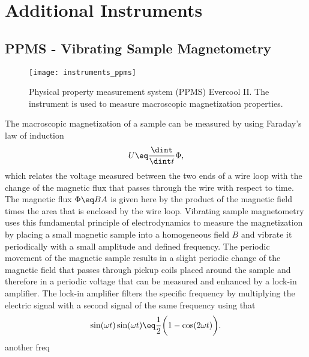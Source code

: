 \documentclass[\main/dresen_thesis.tex]{subfiles}
\begin{document}
\chapter{Additional Instruments}
\section{PPMS - Vibrating Sample Magnetometry}
\label{app:additionalExperimentalTechniques:vsm}
\begin{figure}[h]
  \centering
  \texttt{[image: instruments\_ppms]}
  \caption{\label{fig:appendix:instruments:ppms}Physical property measurement system (PPMS) Evercool II. The instrument is used to measure macroscopic magnetization properties.}
\end{figure}
The macroscopic magnetization of a sample can be measured by using Faraday's law of induction
\begin{align}
  U \eq \frac{\dint }{\dint t} \Phi,
\end{align}
which relates the voltage measured between the two ends of a wire loop with the change of the magnetic flux that passes through the wire with respect to time.
The magnetic flux $\Phi \eq B A$ is given here by the product of the magnetic field times the area that is enclosed by the wire loop.
Vibrating sample magnetometry uses this fundamental principle of electrodynamics to measure the magnetization by placing a small magnetic sample into a homogeneous field $B$ and vibrate it periodically with a small amplitude and defined frequency.
The periodic movement of the magnetic sample results in a slight periodic change of the magnetic field that passes through pickup coils placed around the sample and therefore in a periodic voltage that can be measured and enhanced by a lock-in amplifier.
The lock-in amplifier filters the specific frequency by multiplying the electric signal with a second signal of the same frequency using that
\begin{align}
  \sin(\omega t) \sin(\omega t) \eq \frac{1}{2} \biggl( 1 - \cos (2 \omega t) \biggr).
\end{align}
another freq
\end{document}
